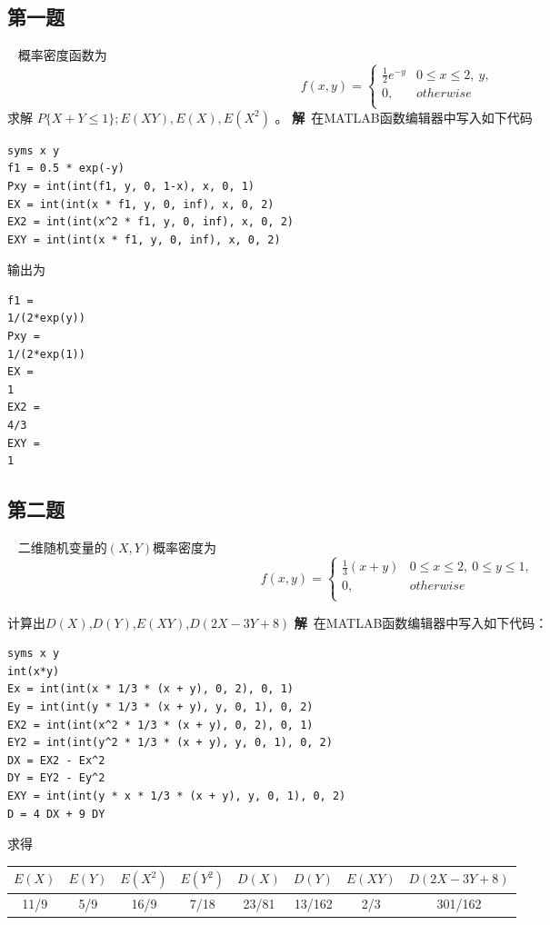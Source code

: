 \documentclass[12pt, a4paper]{ctexart}
\newcommand{\exercise}[1]{\noindent\tcbox[on line,top=0mm,bottom=0mm,%
	right=0mm,left=0mm]{\bfseries 练习#1}\ }
\newcommand{\solve}{\newline\noindent\textbf{解}\ }
\begin{document}
\subsection{第一题}
\exercise{1} 概率密度函数为
\[
f(x,y) = \left\lbrace \begin{array}{cc}
\frac{1}{2}e^{-y} & 0 \leq x \leq 2, ~ y  , \\
0, & otherwise \\
\end{array} \right.
\]
求解 $P\{X + Y \le 1\}; E(XY), E(X), E(X^2)$ 。
\solve 在MATLAB函数编辑器中写入如下代码
\begin{lstlisting}[style=Matlab-editor]
syms x y
f1 = 0.5 * exp(-y)
Pxy = int(int(f1, y, 0, 1-x), x, 0, 1)
EX = int(int(x * f1, y, 0, inf), x, 0, 2)
EX2 = int(int(x^2 * f1, y, 0, inf), x, 0, 2)
EXY = int(int(x * f1, y, 0, inf), x, 0, 2)
\end{lstlisting}

输出为
\begin{lstlisting}[style=Matlab-editor]
f1 =
1/(2*exp(y))
Pxy =
1/(2*exp(1))
EX =
1
EX2 =
4/3
EXY =
1
\end{lstlisting}

\subsection{第二题}
\exercise{2}
二维随机变量的$ (X,Y) $概率密度为
\[
f(x,y) = \left\lbrace \begin{array}{cc}
\frac{1}{3}(x + y) & 0 \leq x \leq 2, ~0 \leq y \leq 1, \\
0, & otherwise \\
\end{array} \right.
\]

计算出$ D(X) $,$ D(Y) $,$ E(XY) $,$ D(2X-3Y+8) $
\solve 在MATLAB函数编辑器中写入如下代码：
\begin{lstlisting}[style=Matlab-editor]
syms x y
int(x*y)
Ex = int(int(x * 1/3 * (x + y), 0, 2), 0, 1)
Ey = int(int(y * 1/3 * (x + y), y, 0, 1), 0, 2)
EX2 = int(int(x^2 * 1/3 * (x + y), 0, 2), 0, 1)
EY2 = int(int(y^2 * 1/3 * (x + y), y, 0, 1), 0, 2)
DX = EX2 - Ex^2
DY = EY2 - Ey^2
EXY = int(int(y * x * 1/3 * (x + y), y, 0, 1), 0, 2)
D = 4 DX + 9 DY
\end{lstlisting}

求得\par

\begin{tabular}{cccc|cccc}
	\hline
 $ E(X) $&$ E(Y) $ &$ E(X^2) $ &$ E(Y^2) $ & $ D(X) $&$ D(Y) $ & $ E(XY) $&$ D(2X-3Y+8) $ \\
 \hline
11/9 &5/9 &16/9 & 7/18&23/81 & 13/162 & 2/3& 301/162\\
\hline
\end{tabular}
\end{document}
